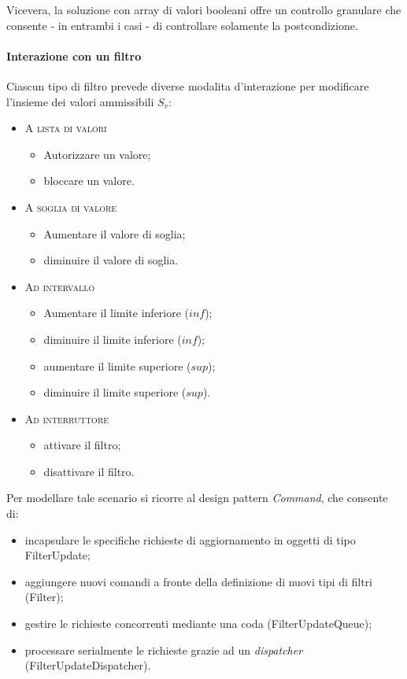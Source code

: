 Vicevera, la soluzione con array di valori booleani offre un controllo granulare che consente - in entrambi i casi - di controllare solamente la postcondizione. 

\paragraph{Interazione con un filtro}
Ciascun tipo di filtro prevede diverse modalita d'interazione per modificare l'insieme dei valori ammissibili $S_v$:
\begin{itemize}
\item \textsc{A lista di valori}
\begin{itemize}
  \item Autorizzare un valore;
  \item bloccare un valore.
\end{itemize}
\item \textsc{A soglia di valore}
\begin{itemize}
  \item Aumentare il valore di soglia;
  \item diminuire il valore di soglia.
\end{itemize}
\item \textsc{Ad intervallo}
\begin{itemize}
  \item Aumentare il limite inferiore ($inf$);
  \item diminuire il limite inferiore ($inf$);
  \item aumentare il limite superiore ($sup$);
  \item diminuire il limite superiore ($sup$).
\end{itemize}
\item \textsc{Ad interruttore}
\begin{itemize}
  \item attivare il filtro;
  \item disattivare il filtro.
\end{itemize}
\end{itemize}

Per modellare tale scenario si ricorre al design pattern \textit{Command}, che consente di:
\begin{itemize}
  \item incapsulare le specifiche richieste di aggiornamento in oggetti di tipo \textsf{FilterUpdate};
  \item aggiungere nuovi comandi a fronte della definizione di nuovi tipi di filtri (\textsf{Filter});
  \item gestire le richieste concorrenti mediante una coda (\textsf{FilterUpdateQueue});
  \item processare serialmente le richieste grazie ad un \textit{dispatcher} (\textsf{FilterUpdateDispatcher}).
\end{itemize}

